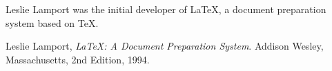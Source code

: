 \documentclass{article}
\begin{document}
Leslie Lamport was the initial developer of \LaTeX, a document preparation system\cite{lamport94} based on \TeX.  

\begin{thebibliography}{999}

  Leslie Lamport,
  \emph{\LaTeX: A Document Preparation System}.
  Addison Wesley, Massachusetts,
  2nd Edition,
  1994.

\end{thebibliography}
\end{document}
